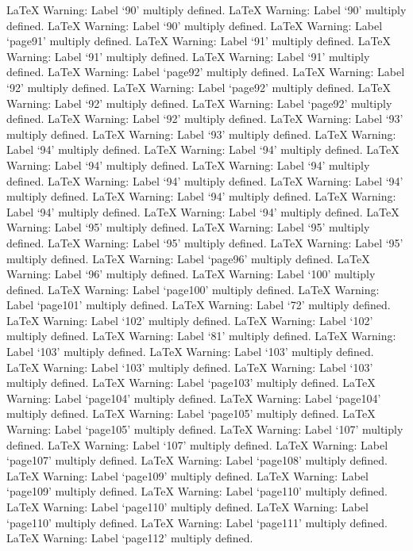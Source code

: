 LaTeX Warning: Label `90' multiply defined.
LaTeX Warning: Label `90' multiply defined.
LaTeX Warning: Label `90' multiply defined.
LaTeX Warning: Label `page91' multiply defined.
LaTeX Warning: Label `91' multiply defined.
LaTeX Warning: Label `91' multiply defined.
LaTeX Warning: Label `91' multiply defined.
LaTeX Warning: Label `page92' multiply defined.
LaTeX Warning: Label `92' multiply defined.
LaTeX Warning: Label `page92' multiply defined.
LaTeX Warning: Label `92' multiply defined.
LaTeX Warning: Label `page92' multiply defined.
LaTeX Warning: Label `92' multiply defined.
LaTeX Warning: Label `93' multiply defined.
LaTeX Warning: Label `93' multiply defined.
LaTeX Warning: Label `94' multiply defined.
LaTeX Warning: Label `94' multiply defined.
LaTeX Warning: Label `94' multiply defined.
LaTeX Warning: Label `94' multiply defined.
LaTeX Warning: Label `94' multiply defined.
LaTeX Warning: Label `94' multiply defined.
LaTeX Warning: Label `94' multiply defined.
LaTeX Warning: Label `94' multiply defined.
LaTeX Warning: Label `94' multiply defined.
LaTeX Warning: Label `95' multiply defined.
LaTeX Warning: Label `95' multiply defined.
LaTeX Warning: Label `95' multiply defined.
LaTeX Warning: Label `95' multiply defined.
LaTeX Warning: Label `page96' multiply defined.
LaTeX Warning: Label `96' multiply defined.
LaTeX Warning: Label `100' multiply defined.
LaTeX Warning: Label `page100' multiply defined.
LaTeX Warning: Label `page101' multiply defined.
LaTeX Warning: Label `72' multiply defined.
LaTeX Warning: Label `102' multiply defined.
LaTeX Warning: Label `102' multiply defined.
LaTeX Warning: Label `81' multiply defined.
LaTeX Warning: Label `103' multiply defined.
LaTeX Warning: Label `103' multiply defined.
LaTeX Warning: Label `103' multiply defined.
LaTeX Warning: Label `103' multiply defined.
LaTeX Warning: Label `page103' multiply defined.
LaTeX Warning: Label `page104' multiply defined.
LaTeX Warning: Label `page104' multiply defined.
LaTeX Warning: Label `page105' multiply defined.
LaTeX Warning: Label `page105' multiply defined.
LaTeX Warning: Label `107' multiply defined.
LaTeX Warning: Label `107' multiply defined.
LaTeX Warning: Label `page107' multiply defined.
LaTeX Warning: Label `page108' multiply defined.
LaTeX Warning: Label `page109' multiply defined.
LaTeX Warning: Label `page109' multiply defined.
LaTeX Warning: Label `page110' multiply defined.
LaTeX Warning: Label `page110' multiply defined.
LaTeX Warning: Label `page110' multiply defined.
LaTeX Warning: Label `page111' multiply defined.
LaTeX Warning: Label `page112' multiply defined.
